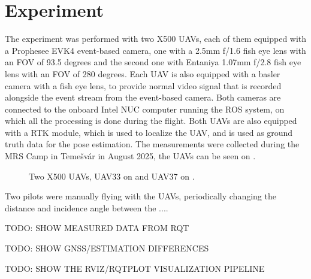 
\chapter{Experiment\label{chap:experiment}}

The experiment was performed with two X500 \ac{UAV}s, each of them equipped with a Prophesee EVK4 event-based camera, one with a 2.5mm f/1.6
fish eye lens with an \ac{FOV} of 93.5 degrees and the second one with Entaniya 1.07mm f/2.8 fish eye lens with an \ac{FOV} of 280 degrees.
Each UAV is also equipped with a basler camera with a fish eye lens, to provide normal video signal that is recorded alongside the event stream
from the event-based camera.
Both cameras are connected to the onboard Intel NUC computer running the ROS system, on which all the processing is done during the flight. Both 
\ac{UAV}s are also equipped with a \ac{RTK} module, which is used to localize the \ac{UAV}, and is used as ground truth data for the pose estimation.
The measurements were collected during the \ac{MRS} Camp in Temešvár in August 2025, the \ac{UAV}s can be seen on .

\begin{figure}[H]
	\centering
	\caption{
		Two X500 UAVs, UAV33 on  and UAV37 on .
  }
	\label{fig:uav33_37}
\end{figure}
Two pilots were manually flying with the \ac{UAV}s, periodically changing the distance and incidence angle between the ....

TODO: SHOW MEASURED DATA FROM RQT

TODO: SHOW GNSS/ESTIMATION DIFFERENCES

TODO: SHOW THE RVIZ/RQTPLOT VISUALIZATION PIPELINE